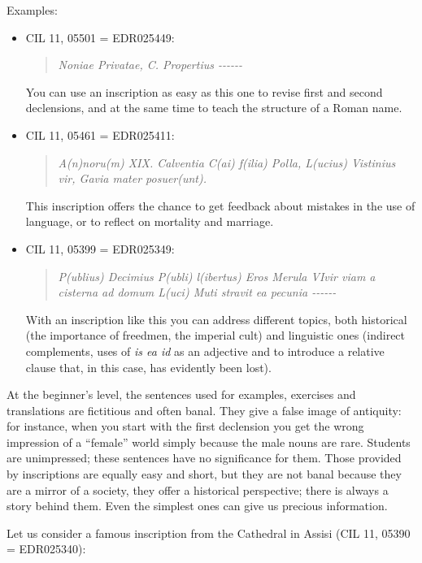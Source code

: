 \documentclass[amsthm,ebook]{saparticle}
\begin{document}
Examples:

\begin{itemize}
\item CIL 11, 05501 = EDR025449: \begin{quotation}
\emph{Noniae Privatae, C. Propertius -{}-{}-{}-{}-{}-}
\end{quotation}

You can use an inscription as easy as this one to revise first and second declensions, and at the same time to teach the
structure of a Roman name.

\item CIL 11, 05461 = EDR025411: \begin{quotation}
\emph{A(n)noru(m) XIX. Calventia C(ai) f(ilia) Polla, L(ucius)
Vistinius vir, Gavia mater posuer(unt). }

\end{quotation}
This inscription offers the chance to get feedback about mistakes in the use of language, or to reflect on mortality and
marriage.

\item CIL 11, 05399 = EDR025349: \begin{quotation}
\emph{P(ublius) Decimius P(ubli) l(ibertus) Eros Merula VIvir
viam a cisterna ad domum L(uci) Muti stravit ea pecunia -{}-{}-{}-{}-{}- }
\end{quotation}

With an inscription like this you can address different topics, both historical (the importance of freedmen, the
imperial cult) and linguistic ones (indirect complements, uses of \emph{is ea id} as an adjective and to introduce a relative
clause that, in this case, has evidently been lost).
\end{itemize}





At the beginner’s level, the sentences used for examples, exercises and translations are fictitious and often banal.
They give a false image of antiquity: for instance, when you start with the first declension you get the wrong
impression of a ``female'' world simply because the male nouns are rare. Students are unimpressed; these sentences have
no significance for them. Those provided by inscriptions are equally easy and short, but they are not banal because
they are a mirror of a society, they offer a historical perspective; there is always a story behind them. Even the
simplest ones can give us precious information.

Let us consider a famous inscription from the Cathedral in Assisi (CIL 11, 05390 = EDR025340):
\end{document}
